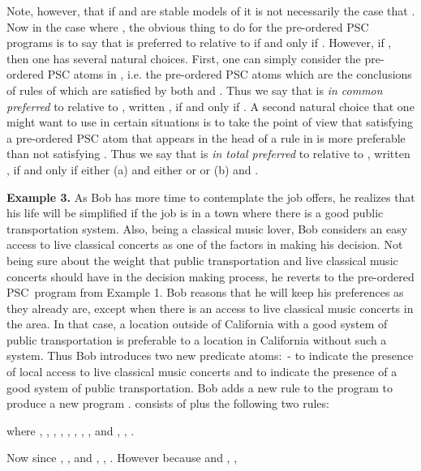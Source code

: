 \documentclass[letterpaper]{article}\usepackage{aaai}
\begin{document}
Note, however, that if  and  are stable models of  it is not
necessarily the case that . Now in the case where
, the obvious thing to do for the pre-ordered PSC
programs is to say that  is preferred to  relative to  if and
only if . However, if , then one has several natural choices. First, one can
simply consider the pre-ordered PSC atoms in , i.e. the pre-ordered PSC atoms which are the conclusions of rules of 
which are satisfied by both  and . Thus we say that  is
\emph{in common preferred} to  relative to , written , if and only if . A second natural choice that one might want to use in
certain situations is to take the point of view that satisfying a pre-ordered
PSC atom  that appears in the head of a rule in  is more preferable than
not satisfying . Thus we say that  is \emph{in total preferred} to
 relative to , written , if and only
if either (a)  and either  or  or (b)  and
.

\textbf{Example 3.}\label{Ex3} As Bob has more time to contemplate the job
offers, he realizes that his life will be simplified if the job is in a town
where there is a good public transportation system. Also, being a classical
music lover, Bob considers an easy access to live classical concerts as one of
the factors in making his decision. Not being sure about the weight that
public transportation and live classical music concerts should have in the
decision making process, he reverts to the pre-ordered PSC\ program from
Example 1. Bob reasons that he will keep his preferences as they already are,
except when there is an access to live classical music concerts in the area.
In that case, a location outside of California with a good system of public
transportation is preferable to a location in California without such a
system. Thus Bob introduces two new predicate atoms:\  - to indicate the
presence of local access to live classical music concerts and  to indicate
the presence of a good system of public transportation. Bob adds a new rule to
the program  to produce a new program .  consists of
 plus the following two rules:

where , , , , , , ,
,  and , ,  
  .

Now  since     , ,  and , ,  . However  because   and , , \newline
\end{document}
